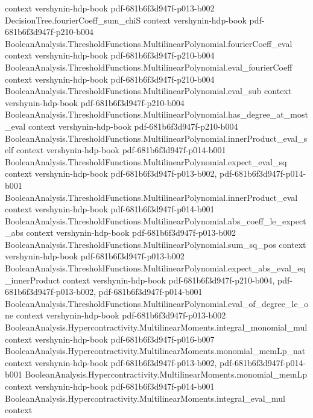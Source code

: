 \begin{theorem}
  {context}
  {vershynin-hdp-book}
  {pdf-681b6f3d947f-p013-b002}
\proofstep
  {DecisionTree.fourierCoeff_sum_chiS}
  {context}
  {vershynin-hdp-book}
  {pdf-681b6f3d947f-p210-b004}
\proofstep
  {BooleanAnalysis.ThresholdFunctions.MultilinearPolynomial.fourierCoeff_eval}
  {context}
  {vershynin-hdp-book}
  {pdf-681b6f3d947f-p210-b004}
\proofstep
  {BooleanAnalysis.ThresholdFunctions.MultilinearPolynomial.eval_fourierCoeff}
  {context}
  {vershynin-hdp-book}
  {pdf-681b6f3d947f-p210-b004}
\proofstep
  {BooleanAnalysis.ThresholdFunctions.MultilinearPolynomial.eval_sub}
  {context}
  {vershynin-hdp-book}
  {pdf-681b6f3d947f-p210-b004}
\proofstep
  {BooleanAnalysis.ThresholdFunctions.MultilinearPolynomial.has_degree_at_most_eval}
  {context}
  {vershynin-hdp-book}
  {pdf-681b6f3d947f-p210-b004}
\proofstep
  {BooleanAnalysis.ThresholdFunctions.MultilinearPolynomial.innerProduct_eval_self}
  {context}
  {vershynin-hdp-book}
  {pdf-681b6f3d947f-p014-b001}
\proofstep
  {BooleanAnalysis.ThresholdFunctions.MultilinearPolynomial.expect_eval_sq}
  {context}
  {vershynin-hdp-book}
  {pdf-681b6f3d947f-p013-b002,
    pdf-681b6f3d947f-p014-b001}
\proofstep
  {BooleanAnalysis.ThresholdFunctions.MultilinearPolynomial.innerProduct_eval}
  {context}
  {vershynin-hdp-book}
  {pdf-681b6f3d947f-p014-b001}
\proofstep
  {BooleanAnalysis.ThresholdFunctions.MultilinearPolynomial.abs_coeff_le_expect_abs}
  {context}
  {vershynin-hdp-book}
  {pdf-681b6f3d947f-p013-b002}
\proofstep
  {BooleanAnalysis.ThresholdFunctions.MultilinearPolynomial.sum_sq_pos}
  {context}
  {vershynin-hdp-book}
  {pdf-681b6f3d947f-p013-b002}
\proofstep
  {BooleanAnalysis.ThresholdFunctions.MultilinearPolynomial.expect_abs_eval_eq_innerProduct}
  {context}
  {vershynin-hdp-book}
  {pdf-681b6f3d947f-p210-b004,
    pdf-681b6f3d947f-p013-b002,
    pdf-681b6f3d947f-p014-b001}
\proofstep
  {BooleanAnalysis.ThresholdFunctions.MultilinearPolynomial.eval_of_degree_le_one}
  {context}
  {vershynin-hdp-book}
  {pdf-681b6f3d947f-p013-b002}
\proofstep
  {BooleanAnalysis.Hypercontractivity.MultilinearMoments.integral_monomial_mul}
  {context}
  {vershynin-hdp-book}
  {pdf-681b6f3d947f-p016-b007}
\proofstep
  {BooleanAnalysis.Hypercontractivity.MultilinearMoments.monomial_memLp_nat}
  {context}
  {vershynin-hdp-book}
  {pdf-681b6f3d947f-p013-b002,
    pdf-681b6f3d947f-p014-b001}
\proofstep
  {BooleanAnalysis.Hypercontractivity.MultilinearMoments.monomial_memLp}
  {context}
  {vershynin-hdp-book}
  {pdf-681b6f3d947f-p014-b001}
\proofstep
  {BooleanAnalysis.Hypercontractivity.MultilinearMoments.integral_eval_mul}
  {context}

\end{theorem}
